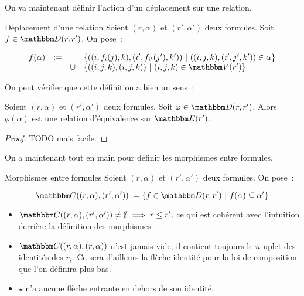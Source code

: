 On va maintenant définir l'action d'un déplacement sur une relation.

\begin{defi}{Déplacement d'une relation}
    Soient $(r,\alpha)$ et $(r',\alpha')$ deux formules. Soit $f\in\D(r,r')$. On pose~:

    \[ \begin{array}{rccl}
          f(\alpha) &:= & & \{ ((i,f_i(j), k), (i', f_{i'}(j'), k'))
                              ~|~ ((i,j,k), (i',j',k'))\in \alpha \} \\
                    &   & \cup &\{ ((i,j,k), (i,j,k)) ~|~ (i,j,k)\in\V(r') \} \\
    \end{array} \]
\end{defi}

On peut vérifier que cette définition a bien un sens~:

\begin{lem}
    Soient $(r,\alpha)$ et $(r',\alpha')$ deux formules. Soit $\phi\in\D(r,r')$.
    Alors $\phi(\alpha)$ est une relation d'équivalence sur $\E(r')$.
\end{lem}

\begin{proof}
    TODO mais facile.
\end{proof}

On a maintenant tout en main pour définir les morphismes entre formules.

\begin{defi}{Morphismes entre formules}
    Soient $(r,\alpha)$ et $(r',\alpha')$ deux formules. On pose~:

    \[\C((r,\alpha),(r',\alpha')) := \{ f\in\D(r,r') ~|~
                                        f(\alpha)\subseteq \alpha' \}\]
\end{defi}

\begin{rem}\begin{itemize}
    \item $\C((r,\alpha), (r',\alpha'))\neq\emptyset \implies r\leq r'$, ce qui
        est cohérent avec l'intuition derrière la définition des morphismes.
    \item $\C((r,\alpha), (r,\alpha))$ n'est jamais vide, il contient toujours le $n$-uplet
        des identités des $r_i$. Ce sera d'ailleurs la flèche identité pour la loi
        de composition que l'on définira plus bas.
    \item $\star$ n'a aucune flèche entrante en dehors de son identité.
\end{itemize}\end{rem}


